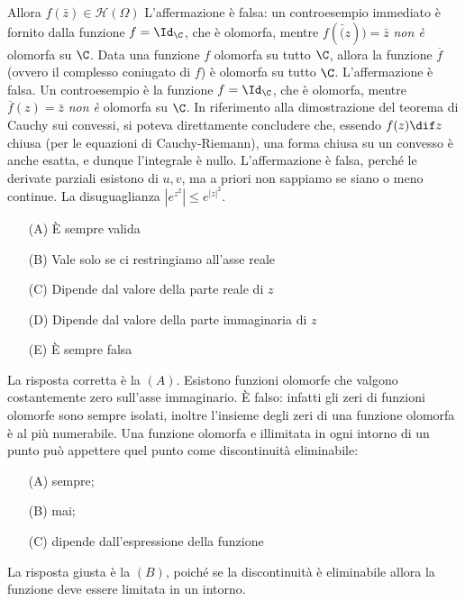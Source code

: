     Allora $f(\bar{z}) \in \mathcal{H}(\Omega)$
    L'affermazione è falsa: un controesempio immediato è fornito dalla funzione $ f=\Id_{\C} $, che è olomorfa, mentre $ f(\bar(z))=\bar{z} $ \emph{non è} olomorfa su $ \C $.
    Data una funzione $ f $ olomorfa su tutto $ \C $, allora la funzione $ \overline{f} $ (ovvero il complesso coniugato di $ f $) è olomorfa su tutto $ \C $.
    L'affermazione è falsa. Un controesempio è la funzione $ f =\Id_{\C}  $, che è olomorfa, mentre $ \overline{f}(z)=\bar{z} $ \emph{non è} olomorfa su $ \C $.
    In riferimento alla dimostrazione del teorema di Cauchy sui convessi, si poteva direttamente concludere che, essendo $f(z)\dif z$ chiusa (per le equazioni di Cauchy-Riemann), una forma chiusa su un convesso è anche esatta, e dunque l'integrale è nullo.
    L'affermazione è falsa, perché le derivate parziali esistono di $u, v$, ma a priori non sappiamo se siano o meno continue.
    La disuguaglianza $|e^{z^2}| \leq e^{|z|^2}$.
    \begin{itemize}
        \item[(A)] È sempre valida
        \item[(B)] Vale solo se ci restringiamo all'asse reale
        \item[(C)] Dipende dal valore della parte reale di $z$
        \item[(D)] Dipende dal valore della parte immaginaria di $z$
        \item[(E)] È sempre falsa
    \end{itemize}
    La risposta corretta è la $ (A) $.
    Esistono funzioni olomorfe che valgono costantemente zero sull'asse immaginario.
    È falso: infatti gli zeri di funzioni olomorfe sono sempre isolati, inoltre l'insieme degli zeri di una funzione olomorfa è al più numerabile.
    Una funzione olomorfa e illimitata in ogni intorno di un punto può appettere quel punto come discontinuità eliminabile: \begin{itemize}
        \item[(A)] sempre; 
        \item[(B)] mai; 
        \item[(C)] dipende dall'espressione della funzione
    \end{itemize}
    La risposta giusta è la $ (B) $, poiché se la discontinuità è eliminabile allora la funzione deve essere limitata in un intorno. 
